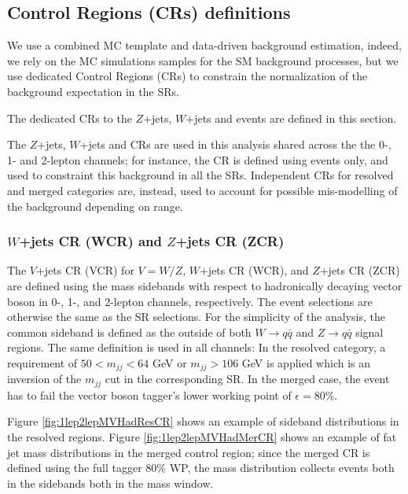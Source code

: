 \clearpage
\subsection{Control Regions (CRs) definitions}
\label{subsec:cr_selection}

We use a combined MC template and data-driven background estimation, indeed, we rely on the MC simulations samples for the SM background processes, but we use dedicated Control Regions (CRs) to constrain the normalization of the background expectation in the SRs.

The dedicated CRs to the $Z$+jets, $W$+jets and \ttbar events are defined in this section.

The $Z$+jets, $W$+jets and \ttbar CRs are used in this analysis shared 
across the the 0-, 1- and 2-lepton channels;
for instance, the \ttbar CR is defined using \olep events only, 
and used to constraint this background in all the SRs.
Independent CRs for resolved and merged categories are, instead,
used to account for possible mis-modelling of the background depending on \pt range.

\subsubsection{$W$+jets CR (WCR) and $Z$+jets CR (ZCR)}

The $V$+jets CR (VCR) for $V=W/Z$, $W$+jets CR (WCR), and $Z$+jets CR (ZCR) are defined using the mass sidebands with respect to hadronically decaying vector boson in 0-, 1-, and 2-lepton channels, respectively.
The event selections are otherwise the same as the SR selections.
For the simplicity of the analysis, the common sideband is defined as the outside of both $W\to q\bar{q}$ and $Z \to q\bar{q}$ signal regions.
The same definition is used in all channels:
In the resolved category, a requirement of $50 < m_{jj} < 64$ GeV or $m_{jj} > 106$ GeV is applied which is an inversion of the $m_{jj}$ cut in the corresponding SR.
In the merged case, the event has to fail the vector boson tagger's lower working point of $\epsilon=80\%$.

Figure \ref{fig:1lep2lepMVHadResCR} shows an example of sideband distributions in the resolved regions.
Figure \ref{fig:1lep2lepMVHadMerCR} shows an example of fat jet mass distributions in the merged control region; 
since the merged CR is defined using the full tagger 80\% WP, the mass distribution collects events both 
in the sidebands both in the mass window.

